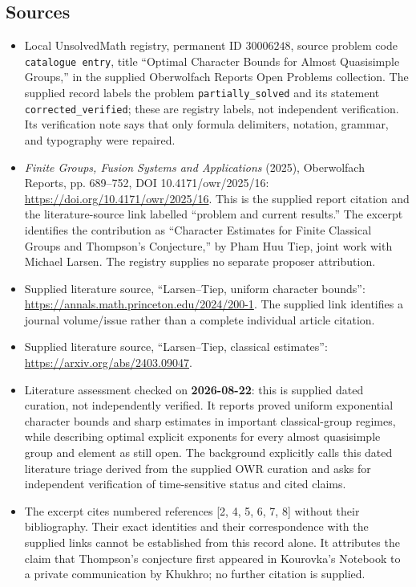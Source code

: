 \documentclass[11pt]{article}
\begin{document}
\subsection{Sources}
\begin{itemize}
\item Local UnsolvedMath registry, permanent ID \(30006248\), source problem code \texttt{catalogue entry}, title ``Optimal Character Bounds for Almost Quasisimple Groups,'' in the supplied Oberwolfach Reports Open Problems collection. The supplied record labels the problem \texttt{partially\_solved} and its statement \texttt{corrected\_verified}; these are registry labels, not independent verification. Its verification note says that only formula delimiters, notation, grammar, and typography were repaired.
\item \emph{Finite Groups, Fusion Systems and Applications} (2025), Oberwolfach Reports, pp. 689--752, DOI 10.4171/owr/2025/16: \url{https://doi.org/10.4171/owr/2025/16}. This is the supplied report citation and the literature-source link labelled ``problem and current results.'' The excerpt identifies the contribution as ``Character Estimates for Finite Classical Groups and Thompson's Conjecture,'' by Pham Huu Tiep, joint work with Michael Larsen. The registry supplies no separate proposer attribution.
\item Supplied literature source, ``Larsen--Tiep, uniform character bounds'': \url{https://annals.math.princeton.edu/2024/200-1}. The supplied link identifies a journal volume/issue rather than a complete individual article citation.
\item Supplied literature source, ``Larsen--Tiep, classical estimates'': \url{https://arxiv.org/abs/2403.09047}.
\item Literature assessment checked on \textbf{2026-08-22}: this is supplied dated curation, not independently verified. It reports proved uniform exponential character bounds and sharp estimates in important classical-group regimes, while describing optimal explicit exponents for every almost quasisimple group and element as still open. The background explicitly calls this dated literature triage derived from the supplied OWR curation and asks for independent verification of time-sensitive status and cited claims.
\item The excerpt cites numbered references [2, 4, 5, 6, 7, 8] without their bibliography. Their exact identities and their correspondence with the supplied links cannot be established from this record alone. It attributes the claim that Thompson's conjecture first appeared in Kourovka's Notebook to a private communication by Khukhro; no further citation is supplied.
\end{itemize}
\end{document}
